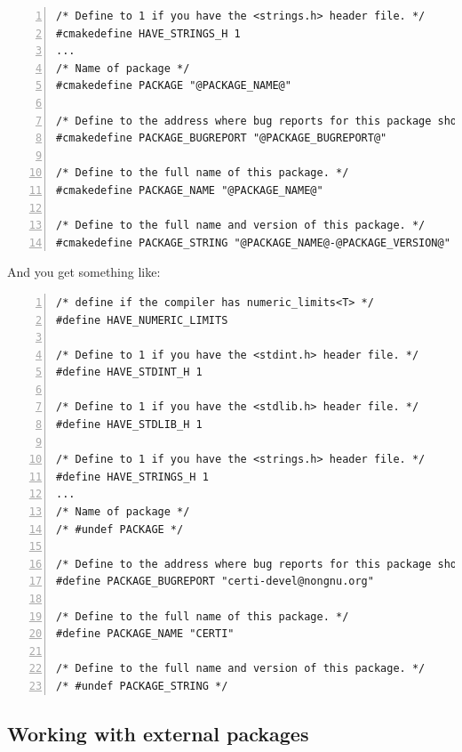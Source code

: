 \documentclass[compress,slidestop,table
              ]
               {beamer}
\newcommand{\fname}[1]{\texttt{#1}}
\begin{document}
\begin{frame}
\begin{Verbatim}[fontsize=\tiny,numbers=left,frame=topline,label=Excerpt from CERTI \fname{config.h.cmake}]
/* Define to 1 if you have the <strings.h> header file. */
#cmakedefine HAVE_STRINGS_H 1
...
/* Name of package */
#cmakedefine PACKAGE "@PACKAGE_NAME@"

/* Define to the address where bug reports for this package should be sent. */
#cmakedefine PACKAGE_BUGREPORT "@PACKAGE_BUGREPORT@"

/* Define to the full name of this package. */
#cmakedefine PACKAGE_NAME "@PACKAGE_NAME@"

/* Define to the full name and version of this package. */
#cmakedefine PACKAGE_STRING "@PACKAGE_NAME@-@PACKAGE_VERSION@"
\end{Verbatim}

And you get something like:
\begin{Verbatim}[fontsize=\tiny,numbers=left,frame=topline,label=Excerpt from generated CERTI \fname{config.h}]
/* define if the compiler has numeric_limits<T> */
#define HAVE_NUMERIC_LIMITS

/* Define to 1 if you have the <stdint.h> header file. */
#define HAVE_STDINT_H 1

/* Define to 1 if you have the <stdlib.h> header file. */
#define HAVE_STDLIB_H 1

/* Define to 1 if you have the <strings.h> header file. */
#define HAVE_STRINGS_H 1
...
/* Name of package */
/* #undef PACKAGE */

/* Define to the address where bug reports for this package should be sent. */
#define PACKAGE_BUGREPORT "certi-devel@nongnu.org"

/* Define to the full name of this package. */
#define PACKAGE_NAME "CERTI"

/* Define to the full name and version of this package. */
/* #undef PACKAGE_STRING */
\end{Verbatim}
\end{frame}

\subsection{Working with external packages}
\end{document}
